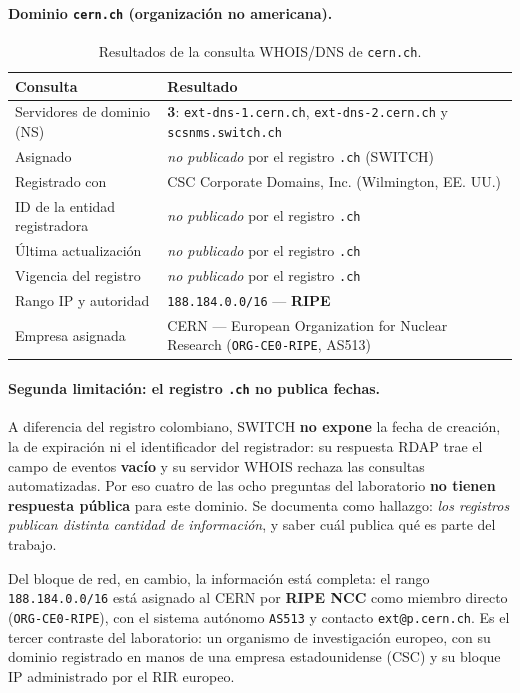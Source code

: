 \documentclass[11pt,a4paper]{report}
\begin{document}
\paragraph{Dominio \texttt{cern.ch} (organización no americana).}

\begin{table}[H]
  \centering
  \begin{tabularx}{\linewidth}{@{}lX@{}}
    \toprule
    \textbf{Consulta} & \textbf{Resultado} \\
    \midrule
    Servidores de dominio (NS) & \textbf{3}: \texttt{ext-dns-1.cern.ch}, \texttt{ext-dns-2.cern.ch} y \texttt{scsnms.switch.ch} \\
    Asignado & \emph{no publicado} por el registro \texttt{.ch} (SWITCH) \\
    Registrado con & CSC Corporate Domains, Inc. (Wilmington, EE. UU.) \\
    ID de la entidad registradora & \emph{no publicado} por el registro \texttt{.ch} \\
    Última actualización & \emph{no publicado} por el registro \texttt{.ch} \\
    Vigencia del registro & \emph{no publicado} por el registro \texttt{.ch} \\
    Rango IP y autoridad & \texttt{188.184.0.0/16} --- \textbf{RIPE} \\
    Empresa asignada & CERN --- European Organization for Nuclear Research (\texttt{ORG-CE0-RIPE}, AS513) \\
    \bottomrule
  \end{tabularx}
  \caption{Resultados de la consulta WHOIS/DNS de \texttt{cern.ch}.}
\end{table}

\paragraph{Segunda limitación: el registro \texttt{.ch} no publica fechas.} A
diferencia del registro colombiano, SWITCH \textbf{no expone} la fecha de creación,
la de expiración ni el identificador del registrador: su respuesta RDAP trae el
campo de eventos \textbf{vacío} y su servidor WHOIS rechaza las consultas
automatizadas. Por eso cuatro de las ocho preguntas del laboratorio \textbf{no
tienen respuesta pública} para este dominio. Se documenta como hallazgo:
\emph{los registros publican distinta cantidad de información}, y saber cuál
publica qué es parte del trabajo.

Del bloque de red, en cambio, la información está completa: el rango
\texttt{188.184.0.0/16} está asignado al CERN por \textbf{RIPE NCC} como miembro
directo (\texttt{ORG-CE0-RIPE}), con el sistema autónomo \texttt{AS513} y contacto
\texttt{ext@p.cern.ch}. Es el tercer contraste del laboratorio: un organismo de
investigación europeo, con su dominio registrado en manos de una empresa
estadounidense (CSC) y su bloque IP administrado por el RIR europeo.
\end{document}
